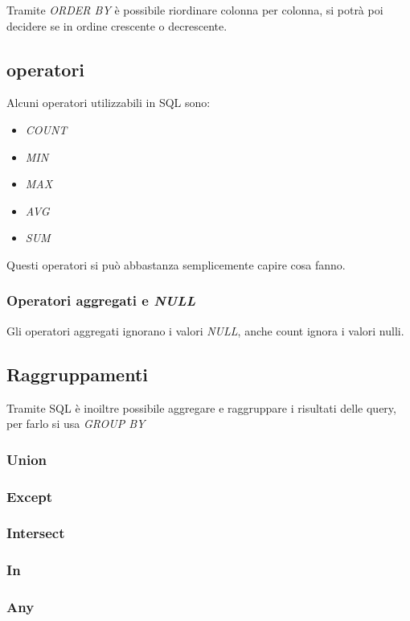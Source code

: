 Tramite \textit{ORDER BY} è possibile riordinare colonna per colonna, si potrà poi decidere se in ordine crescente o decrescente.

\subsection{operatori}

Alcuni operatori utilizzabili in SQL sono: 

\begin{itemize}
    \item \textit{COUNT}
    \item \textit{MIN}
    \item \textit{MAX}
    \item \textit{AVG}
    \item \textit{SUM}
\end{itemize}

Questi operatori si può abbastanza semplicemente capire cosa fanno.

\subsubsection{Operatori aggregati e \textit{NULL}}

Gli operatori aggregati ignorano i valori \textit{NULL}, anche count ignora i valori nulli.

\subsection{Raggruppamenti}
Tramite SQL è inoiltre possibile aggregare e raggruppare i risultati delle query, per farlo si usa \textit{GROUP BY}

\subsubsection{Union}


\subsubsection{Except}
\subsubsection{Intersect}
\subsubsection{In}
\subsubsection{Any}
